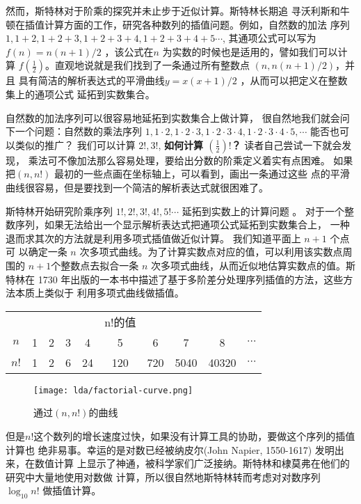 {然而，斯特林对于阶乘的探究并未止步于近似计算。斯特林长期追
寻沃利斯和牛顿在插值计算方面的工作，研究各种数列的插值问题。例如，自然数的加法
序列 $1, 1+2, 1+2+3, 1+2+3+4, 1+2+3+4+5 \cdots$, 其通项公式可以写为 $f(n) =
n(n+1)/2$ ，该公式在$n$ 为实数的时候也是适用的，譬如我们可以计算
$f(\frac{1}{2})$。直观地说就是我们找到了一条通过所有整数点 $(n,n(n+1)/2)$，并且
具有简洁的解析表达式的平滑曲线$y=x(x+1)/2$ ，从而可以把定义在整数集上的通项公式
延拓到实数集合。

自然数的加法序列可以很容易地延拓到实数集合上做计算，
很自然地我们就会问下一个问题：自然数的乘法序列 $1,1\cdot2, 1\cdot2\cdot3,
1\cdot2\cdot3\cdot4, 1\cdot2\cdot3\cdot4\cdot5,  \cdots$ 能否也可以类似的推广？
我们可以计算 $2!,3!$, {\bf 如何计算 $(\frac{1}{2})!$？} 读者自己尝试一下就会发现，
乘法可不像加法那么容易处理，要给出分数的阶乘定义着实有点困难。 
如果把$(n,n!)$ 最初的一些点画在坐标轴上，可以看到，画出一条通过这些
点的平滑曲线很容易，但是要找到一个简洁的解析表达式就很困难了。

斯特林开始研究阶乘序列 $1!, 2!,3!,4!,5!  \cdots$ 延拓到实数上的计算问题
。 对于一个整数序列，如果无法给出一个显示解析表达式把通项公式延拓到实数集合上，
一种退而求其次的方法就是利用多项式插值做近似计算。 我们知道平面上 $n+1$ 个点可
以确定一条 $n$ 次多项式曲线。为了计算实数点对应的值，可以利用该实数点周围的
$n+1$个整数点去拟合一条 $n$ 次多项式曲线，从而近似地估算实数点的值。斯特林在
1730 年出版的一本书中描述了基于多阶差分处理序列插值的方法，这些方法本质上类似于
利用多项式曲线做插值。

\begin{table}[htb]
\centering
\begin{tabular*}{0.9\textwidth}{@{\extracolsep{\fill}}|cccccccccc|}
\hline
&&&&& n!的值 &&&& \\
$n$ & 1 & 2 & 3 & 4 & 5 & 6 & 7 & 8 & $\cdots$ \\
$n!$ & 1 & 2 & 6 & 24 & 120 & 720 & 5040 & 40320 & $\cdots$ \\
\hline
\end{tabular*}
\end{table}

\begin{figure}[htbp]
\centering
\texttt{[image: lda/factorial-curve.png]}
\caption{通过$(n,n!)$的曲线}
\end{figure}

但是$n!$这个数列的增长速度过快，如果没有计算工具的协助，要做这个序列的插值计算也
绝非易事。幸运的是对数已经被纳皮尔(John Napier, 1550-1617) 发明出来，在数值计算
上显示了神通，被科学家们广泛接纳。斯特林和棣莫弗在他们的研究中大量地使用对数做
计算，所以很自然地斯特林转而考虑对对数序列 $\log_{10} n!$ 做插值计算。 

}
